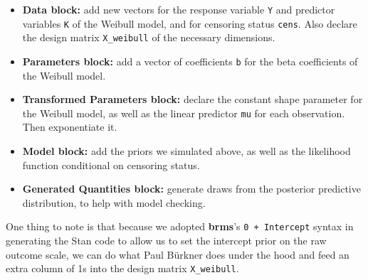 \documentclass[
  letterpaper,
  DIV=11,
  numbers=noendperiod]{scrreprt}
\providecommand{\tightlist}{%
  \setlength{\itemsep}{0pt}\setlength{\parskip}{0pt}}\usepackage{longtable,booktabs,array}
\begin{document}
\begin{itemize}
\tightlist
\item
  \textbf{Data block:} add new vectors for the response variable
  \texttt{Y} and predictor variables \texttt{K} of the Weibull model,
  and for censoring status \texttt{cens}. Also declare the design matrix
  \texttt{X\_weibull} of the necessary dimensions.
\item
  \textbf{Parameters block:} add a vector of coefficients \texttt{b} for
  the beta coefficients of the Weibull model.
\item
  \textbf{Transformed Parameters block:} declare the constant shape
  parameter for the Weibull model, as well as the linear predictor
  \texttt{mu} for each observation. Then exponentiate it.
\item
  \textbf{Model block:} add the priors we simulated above, as well as
  the likelihood function conditional on censoring status.
\item
  \textbf{Generated Quantities block:} generate draws from the posterior
  predictive distribution, to help with model checking.
\end{itemize}

One thing to note is that because we adopted \textbf{brms}'s
\texttt{0\ +\ Intercept} syntax in generating the Stan code to allow us
to set the intercept prior on the raw outcome scale, we can do what Paul
Bürkner does under the hood and feed an extra column of 1s into the
design matrix \texttt{X\_weibull}.
\end{document}
